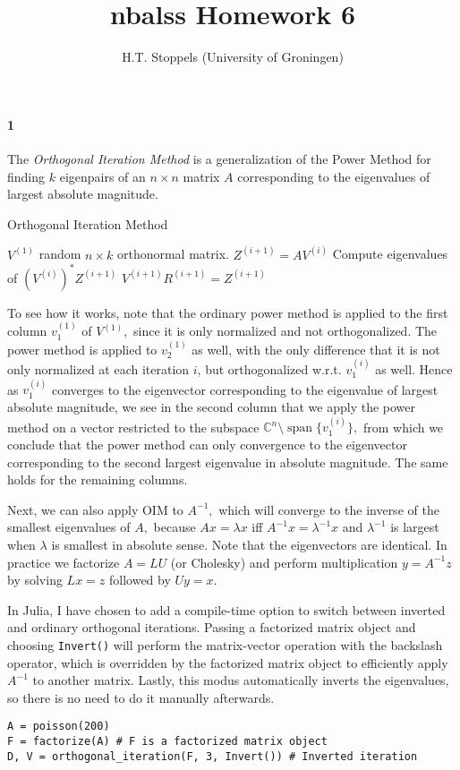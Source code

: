 \documentclass[a4paper]{article}
\author{H.T. Stoppels (University of Groningen)}
\title{{\sc nbalss} Homework 6}
\DeclareMathOperator{\sspan}{span}
\begin{document}
  \maketitle 

  \paragraph{1} The \emph{Orthogonal Iteration Method} is a generalization of the Power Method for finding $k$ eigenpairs of an $n \times n$ matrix $A$ corresponding to the eigenvalues of largest absolute magnitude.

  \begin{algorithm}
\caption{Orthogonal Iteration Method}\label{alg:oim}
\begin{algorithmic}[1]
\State $V^{(1)}$ random $n \times k$ orthonormal matrix.
  \State $Z^{(i+1)} = A V^{(i)}$
  \State Compute eigenvalues of $(V^{(i)})^*Z^{(i+1)}$
  \State $V^{(i+1)}R^{(i+1)} = Z^{(i+1)}$  
\EndFor
\EndProcedure
\end{algorithmic}
\end{algorithm}
  To see how it works, note that the ordinary power method is applied to the first column $v_1^{(1)}$ of $V^{(1)},$ since it is only normalized and not orthogonalized. The power method is applied to $v_2^{(1)}$ as well, with the only difference that it is not only normalized at each iteration $i$, but orthogonalized w.r.t. $v_1^{(i)}$ as well. Hence as $v_1^{(i)}$ converges to the eigenvector corresponding to the eigenvalue of largest absolute magnitude, we see in the second column that we apply the power method on a vector restricted to the subspace $\mathbb{C}^n \setminus \sspan\{v_1^{(i)}\},$ from which we conclude that the power method can only convergence to the eigenvector corresponding to the second largest eigenvalue in absolute magnitude. The same holds for the remaining columns.

  Next, we can also apply OIM to $A^{-1},$ which will converge to the inverse of the smallest eigenvalues of $A,$ because $Ax = \lambda x$ iff $A^{-1}x = \lambda^{-1}x$ and $\lambda^{-1}$ is largest when $\lambda$ is smallest in absolute sense. Note that the eigenvectors are identical. In practice we factorize $A = LU$ (or Cholesky) and perform multiplication $y = A^{-1}z$ by solving $Lx = z$ followed by $Uy = x.$

  In Julia, I have chosen to add a compile-time option to switch between inverted and ordinary orthogonal iterations. Passing a factorized matrix object and choosing {\tt Invert()} will perform the matrix-vector operation with the backslash operator, which is overridden by the factorized matrix object to efficiently apply $A^{-1}$ to another matrix. Lastly, this modus automatically inverts the eigenvalues, so there is no need to do it manually afterwards.
  \begin{lstlisting}
A = poisson(200)
F = factorize(A) # F is a factorized matrix object
D, V = orthogonal_iteration(F, 3, Invert()) # Inverted iteration
  \end{lstlisting}
\end{document}
